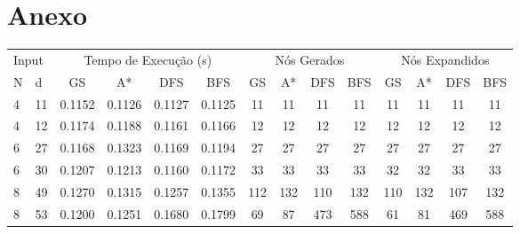 \documentclass[12pt,a4paper]{article}
\begin{document}
\clearpage

\section*{Anexo}

\begin{adjustbox}{width={\textwidth}, totalheight={\textheight}, keepaspectratio}
  \begin{tabular}{ll cccc cccc cccc}
    \toprule
    \multicolumn{2}{l}{Input} & \multicolumn{4}{c}{Tempo de Execução (s)} & \multicolumn{4}{c}{Nós Gerados} & \multicolumn{4}{c}{Nós Expandidos}                                                                                   \\
    \cmidrule(lr){1-2} \cmidrule(lr){3-6} \cmidrule(lr){7-10} \cmidrule(lr){11-14}
    N                         & d                                         & GS                              & A*                                 & DFS    & BFS    & GS    & A*    & DFS   & BFS   & GS    & A*    & DFS   & BFS   \\
    \midrule
    4                         & 11                                        & 0.1152                          & 0.1126                             & 0.1127 & 0.1125 & 11    & 11    & 11    & 11    & 11    & 11    & 11    & 11    \\
    4                         & 12                                        & 0.1174                          & 0.1188                             & 0.1161 & 0.1166 & 12    & 12    & 12    & 12    & 12    & 12    & 12    & 12    \\
    6                         & 27                                        & 0.1168                          & 0.1323                             & 0.1169 & 0.1194 & 27    & 27    & 27    & 27    & 27    & 27    & 27    & 27    \\
    6                         & 30                                        & 0.1207                          & 0.1213                             & 0.1160 & 0.1172 & 33    & 33    & 33    & 33    & 32    & 32    & 33    & 33    \\
    8                         & 49                                        & 0.1270                          & 0.1315                             & 0.1257 & 0.1355 & 112   & 132   & 110   & 132   & 110   & 132   & 107   & 132   \\
    8                         & 53                                        & 0.1200                          & 0.1251                             & 0.1680 & 0.1799 & 69    & 87    & 473   & 588   & 61    & 81    & 469   & 588   \\

\end{tabular}
\end{adjustbox}
\end{document}

